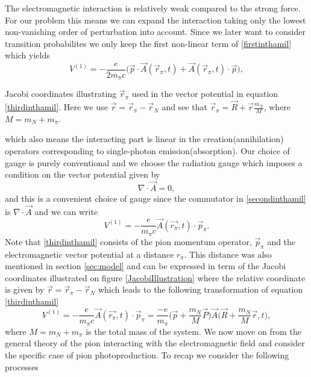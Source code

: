 The electromagnetic interaction is relatively weak compared to the strong force. For our problem this means we can expand the interaction taking only the lowest non-vanishing order of perturbation into account. Since we later want to consider transition probabilites we only keep the first non-linear term of \eqref{firstinthamil} which yields
\begin{equation}\label{secondinthamil}
    V^{(1)} = -\frac{e}{2m_\pi c}\bigg( \vec{p}\cdot \vec{A}(\vec{r}_\pi,t)+\vec{A}(\vec{r}_\pi,t)\cdot \vec{p}\bigg),
\end{equation}
\begin{marginfigure}
\centering

\caption{Jacobi coordinates illustrating $\vec{r}_\pi$ used in the vector potential in equation \ref{thirdinthamil}. Here we use $\vec{r}=\vec{r}_\pi-\vec{r}_N$ and see that $\vec{r}_\pi = \vec{R}+\vec{r}\frac{m_N}{M}$, where $M=m_N+m_\pi$.}
\label{JacobiIllustration}
\end{marginfigure}
\noindent which also means the interacting part is linear in the creation(annihilation) operators corresponding to single-photon emission(absorption). Our choice of gauge is purely conventional and we choose the radiation gauge which imposes a condition on the vector potential given by
\begin{equation}
    \nabla \cdot \vec{A} = 0,
\end{equation}
and this is a convenient choice of gauge since the commutator in \eqref{secondinthamil} is $\nabla \cdot \vec{A}$ and we can write
\begin{equation}\label{thirdinthamil}
    V^{(1)} = -\frac{e}{m_\pi c}\vec{A}(\vec{r_\pi},t)\cdot \vec{p}_\pi. 
\end{equation}
Note that \eqref{thirdinthamil} consists of the pion momentum operator, $\vec{p}_\pi$ and the electromagnetic vector potential at a distance $r_\pi$. This distance was also mentioned in section \ref{sec:model} and can be expressed in term of the Jacobi coordinates illustrated on figure \ref{JacobiIllustration} where the relative coordinate is given by $\vec{r}=\vec{r}_\pi-\vec{r}_N$ which leads to the following transformation of equation \eqref{thirdinthamil}
\begin{equation}
    V^{(1)} = -\frac{e}{m_\pi c}\vec{A}(\vec{r_\pi},t)\cdot \vec{p}_\pi = \frac{-e}{m_\pi} \bigg( \vec{p}+\frac{m_N}{M}\vec{P}\bigg)\vec{A}\bigg(\vec{R}+\frac{m_N}{M}\vec{r},t\bigg),
\end{equation}
where $M=m_N+m_\pi$ is the total mass of the system. We now move on from the general theory of the pion interacting with the electromagnetic field and consider the specific case of pion photoproduction. To recap we consider the following processes

